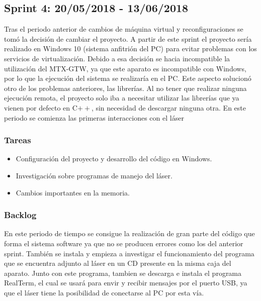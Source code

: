 \subsection{Sprint 4: 20/05/2018 - 13/06/2018}
Tras el periodo anterior de cambios de máquina virtual y reconfiguraciones se tomó la decisión de cambiar el proyecto. A partir de este sprint el proyecto sería realizado en Windows 10 (sistema anfitrión del PC) para evitar problemas con los servicios de virtualización. Debido a esa decisión se hacia incompatible la utilización del MTX-GTW, ya que este aparato es incompatible con Windows, por lo que la ejecución del sistema se realizaría en el PC. Este aspecto solucionó otro de los problemas anteriores, las librerías. Al no tener que realizar ninguna ejecución remota, el proyecto solo iba a necesitar utilizar las librerías que ya vienen por defecto en C$++$, sin necesidad de descargar ninguna otra. En este periodo se comienza las primeras interacciones con el láser
\subsubsection{Tareas}
\begin{itemize}
	\item Configuración del proyecto y desarrollo del código en Windows.
	\item Investigación sobre programas de manejo del láser.
	\item Cambios importantes en la memoria.
\end{itemize}
\subsubsection{Backlog}
En este periodo de tiempo se consigue la realización de gran parte del código que forma el sistema software ya que no se producen errores como los del anterior sprint. También se instala y empieza a investigar el funcionamiento del programa que se encuentra adjunto al láser en un CD presente en la misma caja del aparato. Junto con este programa, tambien se descarga e instala el programa RealTerm, el cual se usará para envir y recibir mensajes por el puerto USB, ya que el láser tiene la posibilidad de conectarse al PC por esta vía.
